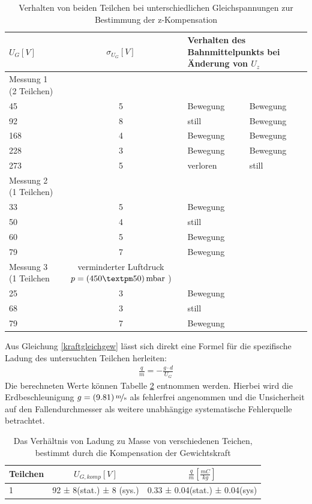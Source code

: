 \documentclass[a4paper,12pt]{article}
\begin{document}
\begin{table}
	\centering
	\begin{tabular}{ l | c | l | l }
		$U_{G} [V]$ & $\sigma_{U_{G}}[V]$ & \multicolumn{2}{l}{Verhalten des Bahnmittelpunkts bei Änderung von $U_z$}  \\
		\hline
		\hline
		Messung 1 (2 Teilchen)\\
		45 & 5 & Bewegung &  Bewegung   \\
		92 & 8 & still  & Bewegung \\
		168 & 4 & Bewegung & Bewegung    \\
		228 & 3 & Bewegung & Bewegung \\
		273 & 5 & verloren & still \\
		\hline
		Messung 2 (1 Teilchen)\\
		33 & 5 & Bewegung \\
		50 & 4 & still\\
		60 & 5 & Bewegung \\
		79 & 7 & Bewegung\\
		\hline
		Messung 3 (1 Teilchen & verminderter Luftdruck $p = \unit[(450±50)]{mbar}$ )\\
		25 & 3 & Bewegung\\
		68 & 3 & still\\
		79 & 7 & Bewegung\\
	\end{tabular}
\caption{Verhalten von beiden Teilchen bei unterschiedlichen Gleichspannungen zur Bestimmung der z-Kompensation}
\label{tab:z-komp-measure}
\end{table}

Aus Gleichung \ref{kraftgleichgew} lässt sich direkt eine Formel für die spezifische Ladung des untersuchten Teilchen herleiten:
\begin{align}\label{zspezm}
	\frac{q}{m} = -\frac{g \cdot  d}{U_{G}}
\end{align}
Die berechneten Werte können Tabelle \ref{tab:z-komp-result} entnommen werden. Hierbei wird die Erdbeschleunigung 
$g = \unitfrac[(9.81)]{m}{s}$ als fehlerfrei angenommen und die Unsicherheit auf den Fallendurchmesser als weitere
unabhängige systematische Fehlerquelle betrachtet.


\begin{table}
	\centering
	\begin{tabular}{ l | c | c }
		Teilchen &$U_{G,komp} [V]$ & $\frac{q}{m}[\frac{mC}{kg}]$  \\
		\hline
		1 &  92 ± 8(stat.) ± 8 (sys.) &  0.33 ± 0.04(stat.) ± 0.04(sys)  \\
	\end{tabular}
\caption{Das Verhältnis von Ladung zu Masse von verschiedenen Teichen, bestimmt durch die Kompensation der Gewichtskraft}
\label{tab:z-komp-result}
\end{table}
\end{document}
